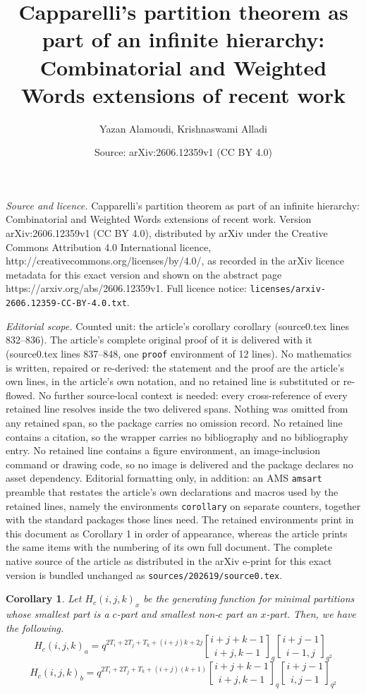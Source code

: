 \documentclass[10pt,a4paper]{amsart}
\title{Capparelli's partition theorem as part of an infinite hierarchy:\\ Combinatorial and Weighted Words extensions of recent work}
\author{Yazan Alamoudi, Krishnaswami Alladi}
\date{Source: arXiv:2606.12359v1 (CC BY 4.0)}
\newtheorem{corollary}{Corollary}
\begin{document}
\maketitle

\noindent\emph{Source and licence.} Capparelli's partition theorem as part of an infinite hierarchy:\\ Combinatorial and Weighted Words extensions of recent work. Version arXiv:2606.12359v1 (CC BY 4.0), distributed by arXiv under the Creative Commons Attribution 4.0 International licence, http://creativecommons.org/licenses/by/4.0/, as recorded in the arXiv licence metadata for this exact version and shown on the abstract page https://arxiv.org/abs/2606.12359v1. Full licence notice: \texttt{licenses/arxiv-2606.12359-CC-BY-4.0.txt}.\par\smallskip

\noindent\textit{Editorial scope.} Counted unit: the article's corollary corollary (source0.tex lines 832--836). The article's complete original proof of it is delivered with it (source0.tex lines 837--848, one \texttt{proof} environment of 12 lines). No mathematics is written, repaired or re-derived: the statement and the proof are the article's own lines, in the article's own notation, and no retained line is substituted or re-flowed.  No further source-local context is needed: every cross-reference of every retained line resolves inside the two delivered spans.  Nothing was omitted from any retained span, so the package carries no omission record.  No retained line contains a citation, so the wrapper carries no bibliography and no bibliography entry.  No retained line contains a figure environment, an image-inclusion command or drawing code, so no image is delivered and the package declares no asset dependency.  Editorial formatting only, in addition: an AMS \texttt{amsart} preamble that restates the article's own declarations and macros used by the retained lines, namely the environments \texttt{corollary} on separate counters, together with the standard packages those lines need.  The retained environments print in this document as Corollary 1 in order of appearance, whereas the article prints the same items with the numbering of its own full document.  The complete native source of the article as distributed in the arXiv e-print for this exact version is bundled unchanged as \texttt{sources/202619/source0.tex}.
\begin{corollary}
Let $H_c(i,j,k)_x$ be the generating function for minimal partitions whose smallest part is a $c$-part and smallest non-$c$ part an $x$-part. Then, we have the following. 
\[H_c(i,j,k)_a=q^{2T_i+2T_j+T_k+(i+j)k+2j}{i+j+k-1\brack i+j,k-1}_q{i+j-1\brack i-1,j}_{q^2}\]
\[H_c(i,j,k)_b=q^{2T_i+2T_j+T_k+(i+j)(k+1)}{i+j+k-1\brack i+j,k-1}_q{i+j-1\brack i,j-1}_{q^2}\]
\end{corollary}
\end{document}
